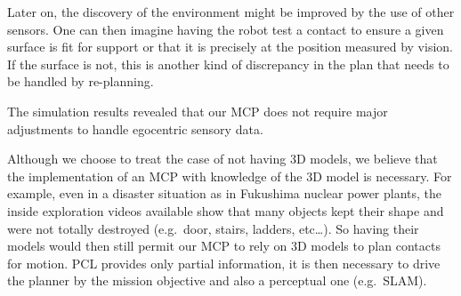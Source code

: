 Later on, the discovery of the environment might be improved by the use of other sensors.
One can then imagine having the robot test a contact to ensure a given surface is fit for support or that it is precisely at the position measured by vision.
If the surface is not, this is another kind of discrepancy in the plan that needs to be handled by re-planning.


The simulation results revealed that our MCP does not require major adjustments to handle egocentric sensory data.

Although we choose to treat the case of not having 3D models, we believe that the implementation of an MCP with knowledge of the 3D model is necessary.
For example, even in a disaster situation as in Fukushima nuclear power plants, the inside exploration videos available show that many objects kept their shape and were not totally destroyed (e.g.\ door, stairs, ladders, etc\ldots).
So having their models would then still permit our MCP to rely on 3D models to plan contacts for motion.
PCL provides only partial information, it is then necessary to drive the planner by the mission objective and also a perceptual one (e.g.\ SLAM).


